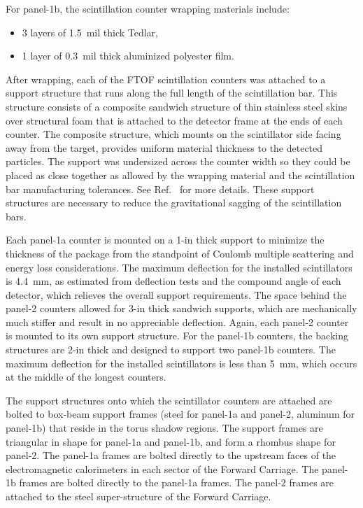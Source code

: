\documentclass[final,3p,twocolumn]{elsarticle}
\begin{document}
\noindent
For panel-1b, the scintillation counter wrapping materials include:

\begin{itemize}
\item 3 layers of 1.5~mil thick Tedlar,
\item 1 layer of 0.3~mil thick aluminized polyester film.
\end{itemize}

After wrapping, each of the FTOF scintillation counters was attached to a support structure that runs
along the full length of the scintillation bar. This structure consists of a composite sandwich structure
of thin stainless steel skins over structural foam that is attached to the detector frame at the ends of
each counter. The composite structure, which mounts on the scintillator side facing away from the target,
provides uniform material thickness to the detected particles.  The support was undersized across the
counter width so they could be placed as close together as allowed by the wrapping material and the
scintillation bar manufacturing tolerances. See Ref.~\cite{tof-nim} for more details. These support
structures are necessary to reduce the gravitational sagging of the scintillation bars.

Each panel-1a counter is mounted on a 1-in thick support to minimize the thickness of the package from
the standpoint of Coulomb multiple scattering and energy loss considerations.  The maximum deflection
for the installed scintillators is 4.4~mm, as estimated from deflection tests and the compound angle of
each detector, which relieves the overall support requirements. The space behind the panel-2 counters
allowed for 3-in thick sandwich supports, which are mechanically much stiffer and result in no appreciable
deflection. Again, each panel-2 counter is mounted to its own support structure. For the panel-1b counters,
the backing structures are 2-in thick and designed to support two panel-1b counters. The maximum
deflection for the installed scintillators is less than 5~mm, which occurs at the middle of the longest
counters.

The support structures onto which the scintillator counters are attached are bolted to box-beam support
frames (steel for panel-1a and panel-2, aluminum for panel-1b) that reside in the torus shadow regions.
The support frames are triangular in shape for panel-1a and panel-1b, and form a rhombus shape for
panel-2. The panel-1a frames are bolted directly to the upstream faces of the electromagnetic
calorimeters in each sector of the Forward Carriage. The panel-1b frames are bolted directly to the
panel-1a frames. The panel-2 frames are attached to the steel super-structure of the Forward Carriage.
\end{document}
